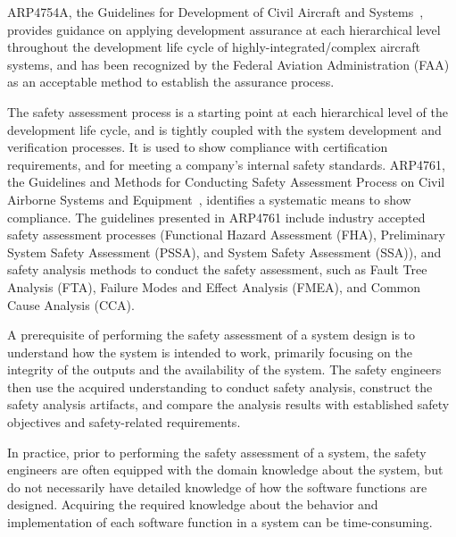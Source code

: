 ARP4754A, the Guidelines for Development of Civil Aircraft and Systems~\cite{SAE:ARP4754A}, provides guidance on applying development assurance at each hierarchical level throughout the development life cycle of highly-integrated/complex aircraft systems, and has been recognized by the Federal Aviation Administration (FAA) as an acceptable method to establish the assurance process.


The safety assessment process is a starting point at each hierarchical level of the development life cycle, and is tightly coupled with the system development and verification processes. It is used to show compliance with certification requirements, and for meeting a company's internal safety standards. ARP4761, the Guidelines and Methods for Conducting Safety Assessment Process on Civil Airborne Systems and Equipment~\cite{SAE:ARP4761},  identifies a systematic means to show compliance. The guidelines presented in ARP4761 include industry accepted safety assessment processes (Functional Hazard Assessment (FHA), Preliminary System Safety Assessment (PSSA), and System Safety Assessment (SSA)), and safety analysis methods to conduct the safety assessment, 
such as Fault Tree Analysis (FTA), Failure Modes and Effect Analysis (FMEA), and Common Cause Analysis (CCA).

A prerequisite of performing the safety assessment of a system design is to understand how the system is intended to work, primarily focusing on the integrity of the outputs and the availability of the system. The safety engineers then use the acquired understanding to conduct safety analysis, construct the safety analysis artifacts, and compare the analysis results with established safety objectives and safety-related requirements. 


In practice, prior to performing the safety assessment of a system, the safety engineers are often equipped with the domain knowledge about the system, but do not necessarily have detailed knowledge of how the software functions are designed. Acquiring the required knowledge about the behavior and implementation of each software function in a system can be time-consuming.

